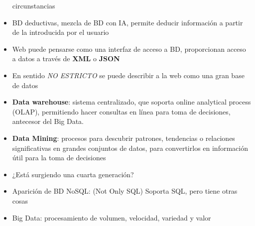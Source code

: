 \begin{itemize}
    circunstancias
    \item BD deductivas, mezcla de BD con IA, permite deducir información 
    a partir de la introducida por el usuario 
    \item Web puede pensarse como una interfaz de acceso a BD, 
    proporcionan acceso a datos a través de \textbf{XML} o \textbf{JSON}
    \item En sentido \textit{NO ESTRICTO} se puede describir a la web como una 
    gran base de datos
    \item \textbf{Data warehouse}: sistema centralizado, 
    que soporta online analytical process (OLAP), 
    permitiendo hacer consultas en línea para toma de decisiones,
    antecesor del Big Data.
    \item \textbf{Data Mining}: procesos para descubrir patrones, tendencias o 
    relaciones significativas en grandes conjuntos de datos,
    para convertirlos en información útil para la toma de decisiones 
    \item ¿Está surgiendo una cuarta generación?
    \item Aparición de BD NoSQL: (Not Only SQL) Soporta SQL, pero tiene otras cosas 
    \item Big Data: procesamiento de volumen, velocidad, variedad y valor
\end{itemize}
